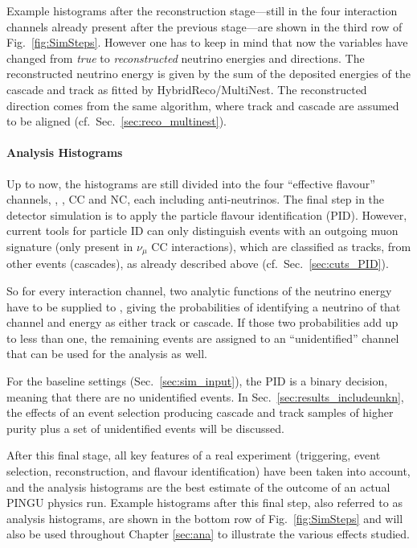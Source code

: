 Example histograms after the reconstruction stage---still in the four
interaction channels already present after the previous stage---are shown in
the third row of Fig.~\ref{fig:SimSteps}. However one has to keep in mind that
now the variables have changed from \emph{true} to \emph{reconstructed}
neutrino energies and directions. The reconstructed neutrino energy is given by
the sum of the deposited energies of the cascade and track as fitted by
HybridReco/MultiNest. The reconstructed direction comes from the same
algorithm, where track and cascade are assumed to be aligned (cf.\
Sec.~\ref{sec:reco_multinest}).

\paragraph{Analysis Histograms}

Up to now, the histograms are still divided into the four ``effective flavour''
channels, \nue, \numu, \nutau CC and \nux NC, each including
anti-neutrinos. The final step in the detector simulation is to apply the
particle flavour identification (PID). However, current tools for particle ID
can only distinguish events with an outgoing muon signature (only present in
$\nu_\mu$ CC interactions), which are classified as tracks, from other events
(cascades), as already described above (cf.\ Sec.~\ref{sec:cuts_PID}).

So for every interaction channel, two analytic functions of the neutrino
energy have to be supplied to \papa, giving the probabilities of identifying a
neutrino of that channel and energy as either track or cascade. If those two
probabilities add up to less than one, the remaining events are assigned to an
``unidentified'' channel that can be used for the analysis as well.

For the baseline settings (Sec.~\ref{sec:sim_input}), the PID is a binary
decision, meaning that there are no unidentified events. In
Sec.~\ref{sec:results_includeunkn}, the effects of an event selection producing
cascade and track samples of higher purity plus a set of unidentified events
will be discussed.

After this final stage, all key features of a real experiment (triggering,
event selection, reconstruction, and flavour identification) have been taken
into account, and the analysis histograms are the best estimate of the outcome
of an actual PINGU physics run. Example histograms after this final step, also
referred to as analysis histograms, are shown in the bottom row of
Fig.~\ref{fig:SimSteps} and will also be used throughout Chapter \ref{sec:ana}
to illustrate the various effects studied.


